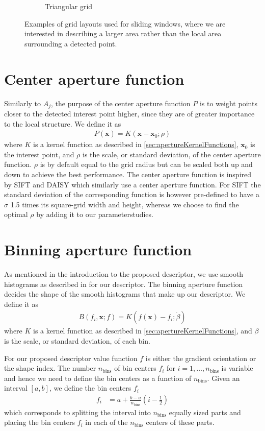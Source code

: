 \documentclass[thesis.tex]{subfiles}
\def\x{\mathbf{x}}
\begin{document}
\begin{figure}
\begin{subfigure}[t]{0.45\textwidth}
		\caption{Triangular grid}
		\label{fig:gridTypeTriangle}
	\end{subfigure}
	\caption{Examples of grid layouts used for sliding windows, where we are interested in describing a larger area rather than the local area surrounding a detected point.}
\label{fig:gridTypeWindow}
\end{figure}
%
\section{Center aperture function}
\label{sec:centerApertureFunction}
%
Similarly to $A_j$, the purpose of the center aperture function $P$ is to weight points closer to the detected interest point higher, since they are of greater importance to the local structure. We define it as
%
\begin{align}
P(\x) = K(\x - \x_0; \rho)
\end{align}
%
where $K$ is a kernel function as described in \ref{sec:apertureKernelFunctions}, $\x_0$ is the interest point, and $\rho$ is the scale, or standard deviation, of the center aperture function. $\rho$ is by default equal to the grid radius but can be scaled both up and down to achieve the best performance. The center aperture function is inspired by SIFT \cite{lowe2004distinctive} and DAISY \cite{tola2008fast} which similarly use a center aperture function. For SIFT the standard deviation of the corresponding function is however pre-defined to have a $\sigma$ 1.5 times its square-grid width and height, whereas we choose to find the optimal $\rho$ by adding it to our parameterstudies.
%
\section{Binning aperture function}
\label{sec:binningApertureFunction}
%
As mentioned in the introduction to the proposed descriptor, we use smooth histograms as described in  for our descriptor. The binning aperture function decides the shape of the smooth histograms that make up our descriptor. We define it as
\begin{align}
	B(f_i, \x; f) = K(f(\x) - f_i; \dot{\beta})
\end{align}
where $K$ is a kernel function as described in \ref{sec:apertureKernelFunctions}, and $\beta$ is the scale, or standard deviation, of each bin.

For our proposed descriptor value function $f$ is either the gradient orientation or the shape index. The number $n_\text{bins}$ of bin centers $f_i$ for $i = 1,\hdots,n_\text{bins}$ is variable and hence we need to define the bin centers as a function of $n_\text{bins}$. Given an interval $[a,b]$, we define the bin centers $f_i$
\begin{align}
	\label{eq:binCenters}
	f_i &= a + \frac{b-a}{n_\text{bins}} \left(i - \frac{1}{2} \right)
\end{align}
which corresponds to splitting the interval into $n_\text{bins}$ equally sized parts and placing the bin centers $f_i$ in each of the $n_\text{bins}$ centers of these parts.
\end{document}
